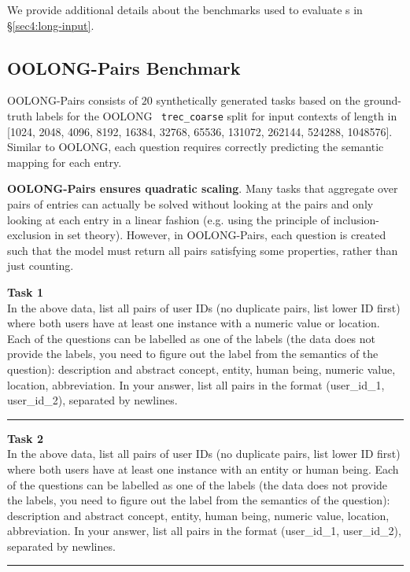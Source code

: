 We provide additional details about the benchmarks used to evaluate \RLM{}s in \S\ref{sec4:long-input}.

\subsection{OOLONG-Pairs Benchmark} \label{appx:oolong-pairs}
OOLONG-Pairs consists of $20$ synthetically generated tasks based on the ground-truth labels for the OOLONG~\cite{bertsch2025oolongevaluatinglongcontext} \texttt{trec\_coarse} split for input contexts of length in [1024, 2048, 4096, 8192, 16384, 32768, 65536, 131072, 262144, 524288, 1048576]. Similar to OOLONG, each question requires correctly predicting the semantic mapping for each entry.

\textbf{OOLONG-Pairs ensures quadratic scaling}. Many tasks that aggregate over pairs of entries can actually be solved without looking at the pairs and only looking at each entry in a linear fashion (e.g. using the principle of inclusion-exclusion in set theory). However, in OOLONG-Pairs, each question is created such that the model must return all pairs satisfying some properties, rather than just counting.

\newcommand{\questionblock}[2]{
\vspace{1.25em}
\noindent\textbf{Task #1}\\[0.25em]
#2
\vspace{0.5em}
\hrule
}

\questionblock{1}{In the above data, list all pairs of user IDs (no duplicate pairs, list lower ID first) where both users have at least one instance with a numeric value or location. Each of the questions can be labelled as one of the labels (the data does not provide the labels, you need to figure out the label from the semantics of the question): description and abstract concept, entity, human being, numeric value, location, abbreviation. In your answer, list all pairs in the format (user\_id\_1, user\_id\_2), separated by newlines.}

\questionblock{2}{In the above data, list all pairs of user IDs (no duplicate pairs, list lower ID first) where both users have at least one instance with an entity or human being. Each of the questions can be labelled as one of the labels (the data does not provide the labels, you need to figure out the label from the semantics of the question): description and abstract concept, entity, human being, numeric value, location, abbreviation. In your answer, list all pairs in the format (user\_id\_1, user\_id\_2), separated by newlines.}

